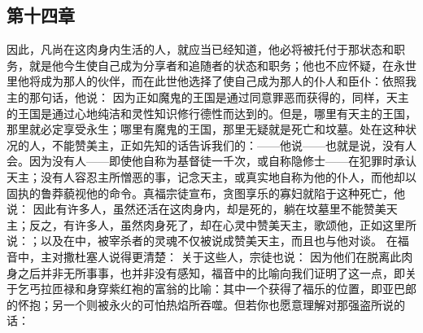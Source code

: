 \subsection{第十四章}

\par

因此，凡尚在这肉身内生活的人，就应当已经知道，他必将被托付于那状态和职务，就是他今生使自己成为分享者和追随者的状态和职务；他也不应怀疑，在永世里他将成为那人的伙伴，而在此世他选择了使自己成为那人的仆人和臣仆：依照我主的那句话，他说：  因为正如魔鬼的王国是通过同意罪恶而获得的，同样，天主的王国是通过心地纯洁和灵性知识修行德性而达到的。但是，哪里有天主的王国，那里就必定享受永生；哪里有魔鬼的王国，那里无疑就是死亡和坟墓。处在这种状况的人，不能赞美主，正如先知的话告诉我们的：——他说——也就是说，没有人会。因为没有人——即使他自称为基督徒一千次，或自称隐修士——在犯罪时承认天主；没有人容忍主所憎恶的事，记念天主，或真实地自称为他的仆人，而他却以固执的鲁莽藐视他的命令。真福宗徒宣布，贪图享乐的寡妇就陷于这种死亡，他说：  因此有许多人，虽然还活在这肉身内，却是死的，躺在坟墓里不能赞美天主；反之，有许多人，虽然肉身死了，却在心灵中赞美天主，歌颂他，正如这里所说：；以及在中，被宰杀者的灵魂不仅被说成赞美天主，而且也与他对谈。 在福音中，主对撒杜塞人说得更清楚：  关于这些人，宗徒也说：  因为他们在脱离此肉身之后并非无所事事，也并非没有感知，福音中的比喻向我们证明了这一点，即关于乞丐拉匝禄和身穿紫红袍的富翁的比喻：其中一个获得了福乐的位置，即亚巴郎的怀抱；另一个则被永火的可怕热焰所吞噬。但若你也愿意理解对那强盗所说的话：  